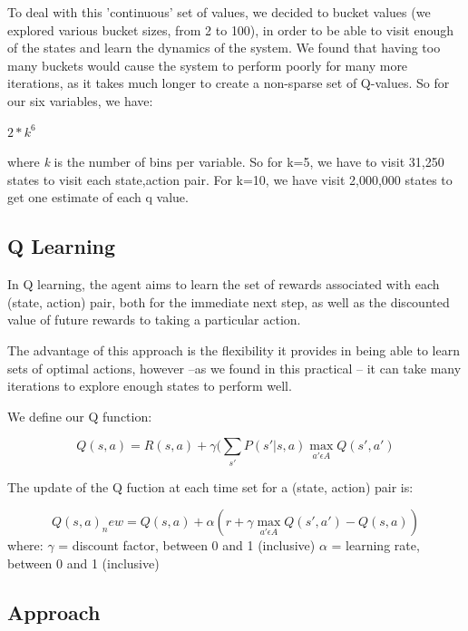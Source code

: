 \documentclass[11pt, oneside]{article}   	%
\begin{document}
To deal with this 'continuous' set of values, we decided to bucket values (we explored various bucket sizes, from 2 to 100), in order to be able to visit enough of the states and learn the dynamics of the system. We found that having too many buckets would cause the system to perform poorly for many more iterations, as it takes much longer to create a non-sparse set of Q-values. So for our six variables, we have:
\begin{center}
{$2*k^{6}$} 
\end{center}
where \textit{k} is the number of bins per variable. So for k=5, we have to visit 31,250 states to visit each state,action pair. For k=10, we have visit 2,000,000 states to get one estimate of each q value.

\subsection*{Q Learning}

In Q learning, the agent aims to learn the set of rewards associated with each (state, action) pair, both for the immediate next step, as well as the discounted value of future rewards to taking a particular action.

The advantage of this approach is the flexibility it provides in being able to learn sets of optimal actions, however --as we found in this practical -- it can take many iterations to explore enough states to perform well.

We define our Q function:

\begin{equation}\label{reio}
Q(s,a) = R(s,a) +  \gamma (\sum_{s \prime} P(s\prime | s, a) \max_{a\prime \epsilon A} Q(s \prime, a \prime)
\end{equation}

The update of the Q fuction at each time set for a (state, action) pair is:

\begin{equation}\label{reio}
Q(s,a)_new = Q(s,a) +  \alpha (r + \gamma \max_{a\prime \epsilon A} Q(s \prime, a \prime) - Q(s,a))
\end{equation}
\newline
where:
\newline
$\gamma$ = discount factor, between 0 and 1 (inclusive)
\newline
$\alpha$ = learning rate, between 0 and 1 (inclusive)
\newline

\subsection*{Approach}
\end{document}
